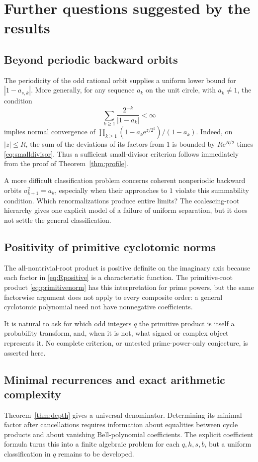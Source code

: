 \documentclass[11pt,letterpaper]{article}
\numberwithin{equation}{section}
\theoremstyle{definition}
\theoremstyle{remark}
\newcommand{\e}{\mathrm e}
\begin{document}
\section{Further questions suggested by the results}
\label{sec:questions}

\subsection{Beyond periodic backward orbits}
The periodicity of the odd rational orbit supplies a uniform lower bound for \(|1-a_{s,k}|\). More generally, for any sequence \(a_k\) on the unit circle, with \(a_k\ne1\), the condition
\begin{equation}
 \sum_{k\geq1}\frac{2^{-k}}{|1-a_k|}<\infty
 \label{eq:smalldivisor}
\end{equation}
implies normal convergence of
\(\prod_{k\geq1}(1-a_k\e^{z/2^k})/(1-a_k)\).
Indeed, on \(|z|\leq R\), the sum of the deviations of its factors from \(1\) is bounded by \(R\e^{R/2}\) times \eqref{eq:smalldivisor}. Thus a sufficient small-divisor criterion follows immediately from the proof of Theorem~\ref{thm:profile}.

A more difficult classification problem concerns coherent nonperiodic backward orbits \(a_{k+1}^2=a_k\), especially when their approaches to \(1\) violate this summability condition. Which renormalizations produce entire limits? The coalescing-root hierarchy gives one explicit model of a failure of uniform separation, but it does not settle the general classification.

\subsection{Positivity of primitive cyclotomic norms}
The all-nontrivial-root product is positive definite on the imaginary axis because each factor in \eqref{eq:Rpositive} is a characteristic function. The primitive-root product \eqref{eq:primitivenorm} has this interpretation for prime powers, but the same factorwise argument does not apply to every composite order: a general cyclotomic polynomial need not have nonnegative coefficients.

It is natural to ask for which odd integers \(q\) the primitive product is itself a probability transform, and, when it is not, what signed or complex object represents it. No complete criterion, or untested prime-power-only conjecture, is asserted here.

\subsection{Minimal recurrences and exact arithmetic complexity}
Theorem~\ref{thm:depth} gives a universal denominator. Determining its minimal factor after cancellations requires information about equalities between cycle products and about vanishing Bell-polynomial coefficients. The explicit coefficient formula turns this into a finite algebraic problem for each \(q,h,s,b\), but a uniform classification in \(q\) remains to be developed.
\end{document}
